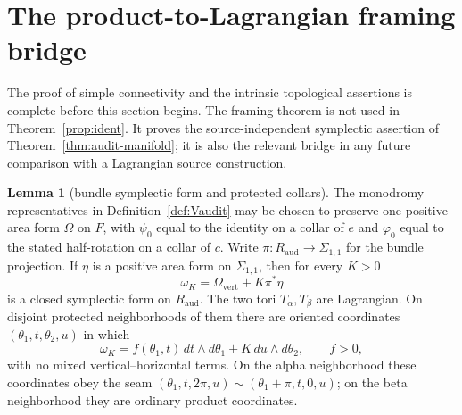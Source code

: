 \documentclass[11pt]{article}
\theoremstyle{definition}
\newtheorem{lemma}[theorem]{Lemma}
\begin{document}
\section{The product-to-Lagrangian framing bridge}\label{sec:framing}

The proof of simple connectivity and the intrinsic topological assertions is
complete before this section begins.  The framing theorem is not used in
Theorem~\ref{prop:ident}.  It proves the source-independent symplectic
assertion of Theorem~\ref{thm:audit-manifold}; it is also the relevant bridge
in any future comparison with a Lagrangian source construction.

\begin{lemma}[bundle symplectic form and protected collars]
\label{lem:bundle-symplectic-form}
The monodromy representatives in Definition~\ref{def:Vaudit} may be chosen
to preserve one positive area form $\Omega$ on $F$, with $\psi_0$ equal to
the identity on a collar of $e$ and $\varphi_0$ equal to the stated
half-rotation on a collar of $c$.  Write
$\pi:R_{\mathrm{aud}}\to\Sigma_{1,1}$ for the bundle projection.  If $\eta$
is a positive area form on $\Sigma_{1,1}$, then for every $K>0$
\[
             \omega_K=\Omega_{\mathrm{vert}}+K\pi^*\eta
\]
is a closed symplectic form on $R_{\mathrm{aud}}$.  The two tori
$T_\alpha,T_\beta$ are Lagrangian.  On disjoint protected neighborhoods of
them there are oriented coordinates
$(\theta_1,t,\theta_2,u)$ in which
\[
 \omega_K=f(\theta_1,t)\,dt\wedge d\theta_1
             +K\,du\wedge d\theta_2,
 \qquad f>0,
\]
with no mixed vertical--horizontal terms.  On the alpha neighborhood these
coordinates obey the seam
$(\theta_1,t,2\pi,u)\sim(\theta_1+\pi,t,0,u)$; on the beta neighborhood they
are ordinary product coordinates.
\end{lemma}
\end{document}

